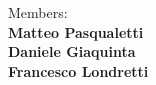 \begin{titlepage}
    \begin{minipage}[t]{0.47\textwidth}
        {\large{Members:}{
            \normalsize\vspace{3mm}\bf\\ \large{Matteo Pasqualetti} 
            \normalsize\vspace{3mm}\bf\\ \large{Daniele Giaquinta}
            \normalsize\vspace{3mm}\bf\\ \large{Francesco Londretti}}}
    \end{minipage}
    \hfill
    
    \vspace{30mm}
    \hrulefill
    
    \end{titlepage}